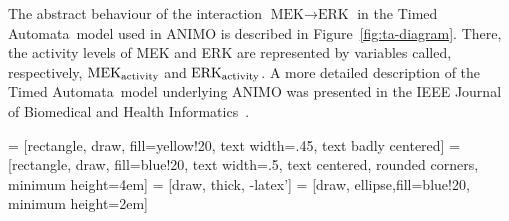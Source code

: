 \documentclass{bmcart}
\def\tas{Timed Automata}
\begin{document}
The abstract behaviour of the interaction $\mbox{MEK} \rightarrow \mbox{ERK}$ in the \tas\ model used in ANIMO is described in Figure~\ref{fig:ta-diagram}.
There, the activity levels of MEK and ERK are represented by variables called, respectively, $\mbox{MEK}_{\mbox{\scriptsize activity}}$
and $\mbox{ERK}_{\mbox{\scriptsize activity}}$. A more detailed description of the \tas\ model underlying ANIMO was
presented in the IEEE Journal of Biomedical and Health Informatics~\cite{animo-ieee}.

 = [rectangle, draw, fill=yellow!20, text width=.45\textwidth, text badly centered]
 = [rectangle, draw, fill=blue!20,
    text width=.5\textwidth, text centered, rounded corners, minimum height=4em]
 = [draw, thick, -latex']
 = [draw, ellipse,fill=blue!20, minimum height=2em]
\def\svgwidth{.8\textwidth}
\newsavebox{\mysquareLow}
\savebox{\mysquareLow}{%
  \raisebox{-0.08em}{%
    \textcolor{black}{%
      \rule{.7em}{.7em}%
    }%
    \hspace{-.65em}%
    \raisebox{.05em}{%
      \textcolor{lowActivity}{%
	\rule{.6em}{.6em}%
      }%
    }%
  }%
}
\newsavebox{\mysquareHigh}
\savebox{\mysquareHigh}{%
  \raisebox{-0.08em}{%
    \textcolor{black}{%
      \rule{.7em}{.7em}%
    }%
    \hspace{-.65em}%
    \raisebox{.05em}{%
      \textcolor{highActivity}{%
	\rule{.6em}{.6em}%
      }%
    }%
  }%
}
\end{document}

